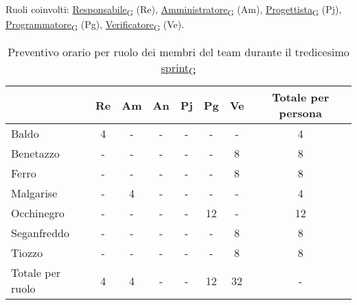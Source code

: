 \newpage
{}
Ruoli coinvolti: \href{https://7last.github.io/docs/pb/documentazione-interna/glossario\#responsabile}{Responsabile\textsubscript{G}} (Re), \href{https://7last.github.io/docs/pb/documentazione-interna/glossario\#amministratore}{Amministratore\textsubscript{G}} (Am), \href{https://7last.github.io/docs/pb/documentazione-interna/glossario\#progettista}{Progettista\textsubscript{G}} (Pj), \href{https://7last.github.io/docs/pb/documentazione-interna/glossario\#programmatore}{Programmatore\textsubscript{G}} (Pg), \href{https://7last.github.io/docs/pb/documentazione-interna/glossario\#verificatore}{Verificatore\textsubscript{G}} (Ve).
\begin{table}[!h]
    \centering
    \begin{tabular}{ | l | c | c | c | c | c | c | c | }
        \hline
        \textbf{} & \textbf{Re} & \textbf{Am} &\textbf{An} & \textbf{Pj} & \textbf{Pg} & \textbf{Ve} & \textbf{Totale per persona} \\
        \hline
        Baldo            &  4   &  -   &  -   &  -   &  -   &  -   &  4   \\
        Benetazzo        &  -   &  -   &  -   &  -   &  -   &  8   &  8   \\
        Ferro            &  -   &  -   &  -   &  -   &  -   &  8   &  8   \\
        Malgarise        &  -   &  4   &  -   &  -   &  -   &  -   &  4   \\
        Occhinegro       &  -   &  -   &  -   &  -   & 12   &  -   & 12   \\
        Seganfreddo      &  -   &  -   &  -   &  -   &  -   &  8   &  8   \\
        Tiozzo           &  -   &  -   &  -   &  -   &  -   &  8   &  8   \\
        \hline
        Totale per ruolo &  4   &  4   &  -   &  -   & 12   & 32   &  -   \\
        \hline
    \end{tabular}
    \caption{Preventivo orario per ruolo dei membri del team durante il tredicesimo \href{https://7last.github.io/docs/pb/documentazione-interna/glossario\#sprint}{sprint\textsubscript{G}}}
    
\end{table}

